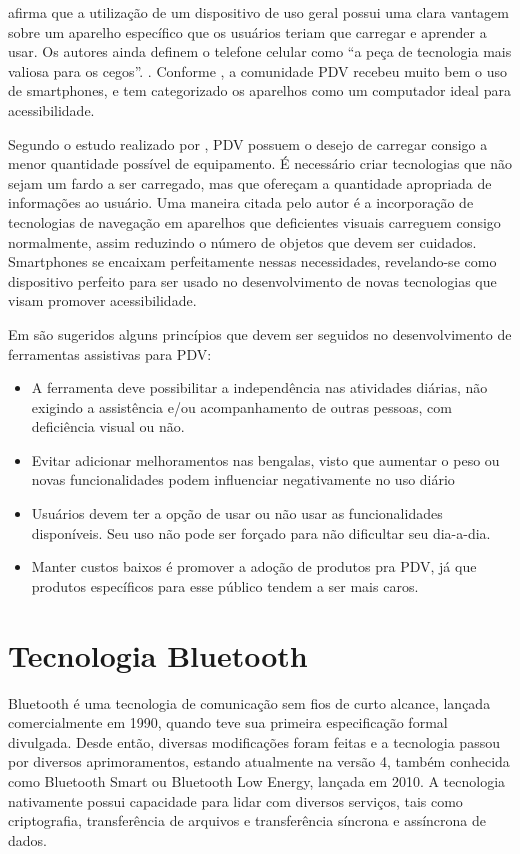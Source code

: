 \documentclass[english,brazilian]{UNISINOSmonografia}
\begin{document}
 afirma que a utilização de um dispositivo de uso geral possui uma clara vantagem sobre um aparelho específico que os usuários teriam que carregar e aprender a usar. Os autores ainda definem o telefone celular como “a peça de tecnologia mais valiosa para os cegos”. \cite{mau2008blindaid}. Conforme , a comunidade PDV recebeu muito bem o uso de smartphones, e tem categorizado os aparelhos como um computador ideal para acessibilidade.

Segundo o estudo realizado por , PDV possuem o desejo de carregar consigo a menor quantidade possível de equipamento. É necessário criar tecnologias que não sejam um fardo a ser carregado, mas que ofereçam a quantidade apropriada de informações ao usuário. Uma maneira citada pelo autor é a incorporação de tecnologias de navegação em aparelhos que deficientes visuais carreguem consigo normalmente, assim reduzindo o número de objetos que devem ser cuidados. Smartphones se encaixam perfeitamente nessas necessidades, revelando-se como dispositivo perfeito para ser usado no desenvolvimento de novas tecnologias que visam promover acessibilidade.

Em  são sugeridos alguns princípios que devem ser seguidos no desenvolvimento de ferramentas assistivas para PDV:
\begin{itemize}
	\item A ferramenta deve possibilitar a independência nas atividades diárias, não exigindo a assistência e/ou acompanhamento de outras pessoas, com deficiência visual ou não.
	\item Evitar adicionar melhoramentos nas bengalas, visto que aumentar o peso ou novas funcionalidades podem influenciar negativamente no uso diário
	\item Usuários devem ter a opção de usar ou não usar as funcionalidades disponíveis. Seu uso não pode ser forçado para não dificultar seu dia-a-dia.
	\item Manter custos baixos é promover a adoção de produtos pra PDV, já que produtos específicos para esse público tendem a ser mais caros.
\end{itemize}

	\section{Tecnologia Bluetooth}
Bluetooth é uma tecnologia de comunicação sem fios de curto alcance, lançada comercialmente em 1990, quando teve sua primeira especificação formal divulgada. Desde então, diversas modificações foram feitas e a tecnologia passou por diversos aprimoramentos, estando atualmente na versão 4, também conhecida como Bluetooth Smart ou Bluetooth Low Energy, lançada em 2010. A tecnologia nativamente possui capacidade para lidar com diversos serviços, tais como criptografia, transferência de arquivos e transferência síncrona e assíncrona de dados.
\end{document}
